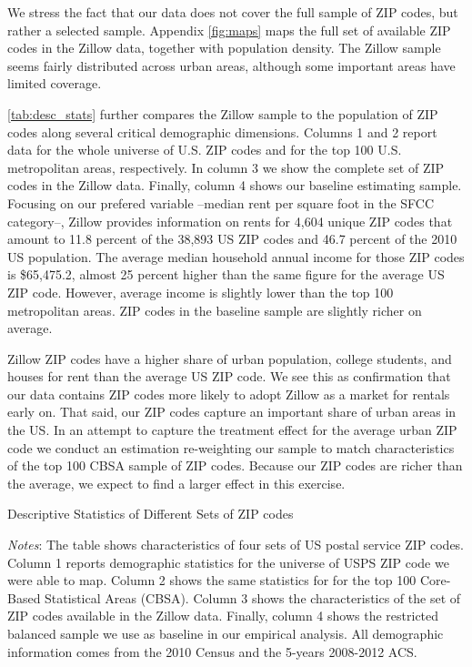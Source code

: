 We stress the fact that our data does not cover the full sample of ZIP codes, but rather a 
selected sample. Appendix \autoref{fig:maps} maps the full set of available 
ZIP codes in the Zillow data, together with population density. The Zillow sample seems 
fairly distributed across urban areas, although some important areas have limited coverage. 

\autoref{tab:desc_stats} further compares the Zillow sample to the population of ZIP codes 
along several critical demographic dimensions. Columns 1 and 2 report data for the whole 
universe of U.S. ZIP codes and for the top 100 U.S. metropolitan areas, respectively. In 
column 3 we show the complete set of ZIP codes in the Zillow data. Finally, column 4 shows 
our baseline estimating sample. Focusing on our prefered variable --median rent per square 
foot in the SFCC category--, Zillow provides information on rents for 4,604 unique ZIP codes 
that amount to 11.8 percent of the 38,893 US ZIP codes and 46.7 percent of the 2010 US 
population. The average median household annual income for those ZIP codes is \$65,475.2, 
almost 25 percent higher than the same figure for the average US ZIP code. However, average 
income is slightly lower than the top 100 metropolitan areas. ZIP codes in the baseline 
sample are slightly richer on average. 

Zillow ZIP codes have a higher share of urban population, college students, and houses for 
rent than the average US ZIP code. We see this as confirmation that our data 
contains ZIP codes more likely to adopt Zillow as a market for rentals early on. That said, 
our ZIP codes capture an important share of urban areas in the US. In an attempt to capture 
the treatment effect for the average urban ZIP code we conduct an estimation re-weighting 
our sample to match characteristics of the top 100 CBSA sample of ZIP codes. Because our 
ZIP codes are richer than the average, we expect to find a larger effect in this exercise.

\begin{table}[h!]
	\caption{Descriptive Statistics of Different Sets of ZIP codes}
	\centering
	\label{tab:desc_stats}    
	
	\begin{minipage}{0.95\textwidth} \footnotesize
		\vspace{3mm} 
		\textit{Notes}: The table shows characteristics of four sets of US postal service 
		ZIP codes. Column 1 reports demographic statistics for the universe of USPS ZIP code we 
		were able to map. Column 2 shows the same statistics for for the top 100 Core-Based 
		Statistical Areas (CBSA). Column 3 shows the characteristics of the set of ZIP codes 
		available in the Zillow data. Finally, column 4 shows the restricted balanced sample 
		we use as baseline in our empirical analysis. All demographic information comes from 
		the 2010 Census and the 5-years 2008-2012 ACS.
	\end{minipage}
\end{table}

